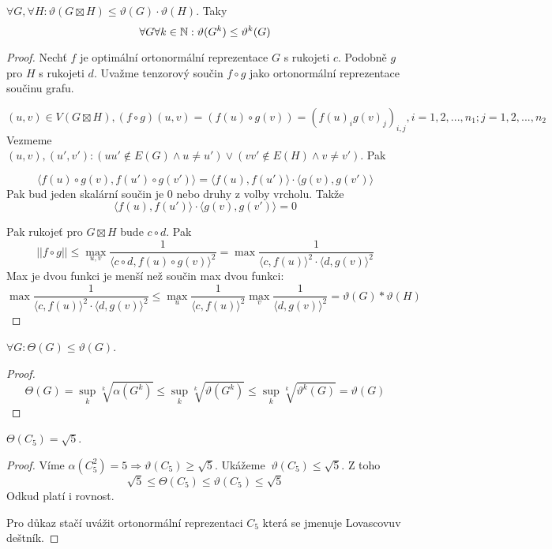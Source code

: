 \begin{lemma}
	$\forall G, \forall H: \vartheta(G \boxtimes H) \leq \vartheta(G) \cdot \vartheta(H)$. Taky
	\[ \forall G \forall k \in \operatorname{\mathbb{N}}: \vartheta(G^k) \leq \vartheta^k(G) \]
\end{lemma}
\begin{proof}
	Nechť $f$ je optimální ortonormální reprezentace $G$ s rukojeti $c$. Podobně $g$ pro $H$ s rukojeti $d$. Uvažme tenzorový součin $f \circ g$ jako ortonormální reprezentace součinu grafu.

	\[ (u, v) \in V(G \boxtimes H), (f \circ g) (u, v) = (f(u) \circ g(v)) = (f(u)_i g(v)_j)_{i, j}, i = 1, 2, ..., n_1; j = 1,2, ..., n_2\]
	Vezmeme $(u, v), (u', v'): (uu' \notin E(G) \land u \ne u') \lor (vv' \notin E(H) \land v \ne v') $. Pak

	\[ \langle f(u) \circ g(v), f(u') \circ g(v') \rangle = \langle f(u), f(u') \rangle \cdot \langle g(v), g(v') \rangle \]
	Pak bud jeden skalární součin je 0 nebo druhy z volby vrcholu. Takže
	\[ \langle f(u), f(u') \rangle \cdot \langle g(v), g(v') \rangle = 0 \]

	Pak rukojeť pro $G \boxtimes H$ bude $c \circ d$. Pak
	\[ || f \circ g || \leq \max_{u, v} \frac{1}{\langle c \circ d, f(u) \circ g(v) \rangle^2} = \max \frac{1}{\langle c, f(u) \rangle^2 \cdot \langle d, g(v) \rangle^2} \]
	Max je dvou funkci je menší než součin max dvou funkci:
	\[ \max \frac{1}{\langle c, f(u) \rangle^2 \cdot \langle d, g(v) \rangle^2} \leq \max_u \frac{1}{\langle c, f(u) \rangle^2} \max_v \frac{1}{\langle d, g(v) \rangle^2} = \vartheta(G) * \vartheta(H) \]
\end{proof}

\begin{lemma}
	$\forall G : \Theta(G) \leq \vartheta(G)$.
\end{lemma}
\begin{proof}
	\[ \Theta(G) = \sup_k \sqrt[k]{\alpha(G^k)} \leq \sup_k \sqrt[k]{\vartheta(G^k)} \leq \sup_k \sqrt[k]{\vartheta^k(G)} = \vartheta(G) \]

\end{proof}

\begin{theorem}
	$ \Theta(C_5) = \sqrt{5}$.
\end{theorem}
\begin{proof}
	Víme $ \alpha(C_5^2) = 5 \Rightarrow \vartheta(C_5) \geq \sqrt{5} $. Ukážeme $\ \vartheta(C_5) \leq \sqrt{5}$. Z toho
	\[ \sqrt{5} \leq \Theta(C_5) \leq \vartheta(C_5) \leq \sqrt{5} \]
	Odkud platí i rovnost.

	Pro důkaz stačí uvážit ortonormální reprezentaci $C_5$ která se jmenuje Lovascovuv deštník.
\end{proof}

